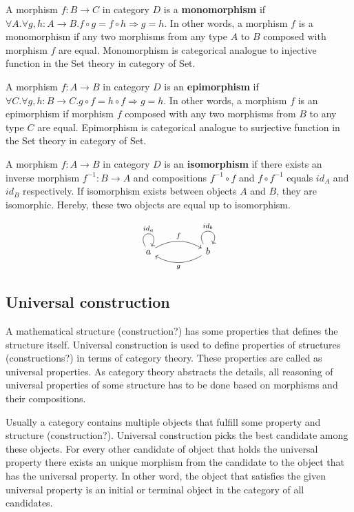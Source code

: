 \documentclass[article]{aaltoseries}
\begin{document}
    A morphism $f: B \rightarrow C$ in category $D$ is a \textbf{monomorphism}
    if $\forall A. \forall g, h: A \rightarrow B. f \circ g = f \circ h
    \Rightarrow g = h$. In other words, a morphism $f$ is a monomorphism if any
    two morphisms from any type $A$ to $B$ composed with morphism $f$ are equal.
    Monomorphism is categorical analogue to injective function in the Set theory
    in category of Set.

    A morphism $f: A \rightarrow B$ in category $D$ is an \textbf{epimorphism}
    if $\forall C. \forall g, h: B \rightarrow C. g \circ f = h \circ f
    \Rightarrow g = h$. In other words, a morphism $f$ is an epimorphism if
    morphism $f$ composed with any two morphisms from $B$ to any type $C$ are
    equal. Epimorphism is categorical analogue to surjective function in the Set
    theory in category of Set.

    A morphism $f: A \rightarrow B$ in category $D$ is an \textbf{isomorphism}
    if there exists an inverse morphism $f^{-1}: B \rightarrow A$ and
    compositions $f^{-1} \circ f$ and $f \circ f^{-1}$ equals $id_A$ and $id_B$
    respectively. If isomorphism exists between objects $A$ and $B$, they are
    isomorphic. Hereby, these two objects are equal up to isomorphism.

    \[
      \begin{tikzcd}[row sep=huge, column sep=huge]
        a \arrow[r, bend left, "f"]
        \arrow[loop above, distance=2em, in=60, out=120, "id_a"]
        & b \arrow[l, bend left, "g"]
        \arrow[loop above, distance=2em, in=60, out=120, "id_b"]
      \end{tikzcd}
    \]


  \subsection{Universal construction} 
    A mathematical structure (construction?) has some properties that defines the
    structure itself. Universal construction is used to define properties of
    structures (constructions?) in terms of category theory. These properties are
    called as universal properties. As category theory abstracts the details, all
    reasoning of universal properties of some structure has to be done based on
    morphisms and their compositions.
 
    Usually a category contains multiple objects that fulfill some property and
    structure (construction?). Universal construction picks the best candidate among
    these objects. For every other candidate of object that holds the universal
    property there exists an unique morphism from the candidate to the object that
    has the universal property. In other word, the object that satisfies the given
    universal property is an initial or terminal object in the category of all
    candidates.
  
\end{document}
